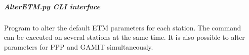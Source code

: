 \documentclass[letterpaper,10pt,english]{sphinxmanual}
\begin{document}
\subparagraph{AlterETM.py \sphinxhyphen{} CLI interface}
\label{\detokenize{pgamit.com:AlterETM.py---CLI-interface}}
\sphinxAtStartPar
Program to alter the default ETM parameters for each station. The command can be executed on several stations at the same time. It is also possible to alter parameters for PPP and GAMIT simultaneously.

\begin{sphinxVerbatim}[commandchars=\\\{\}]
 \PYG{p}{[}\PYG{p}{]} \PYG{p}{[}  \PYG{p}{[} \PYG{p}{]}\PYG{p}{]} \PYG{p}{[}  \PYG{p}{[} \PYG{p}{]}\PYG{p}{]}
            \PYG{p}{[}\PYG{p}{]}
             \PYG{p}{[} \PYG{p}{]}
\end{sphinxVerbatim}
\end{document}
